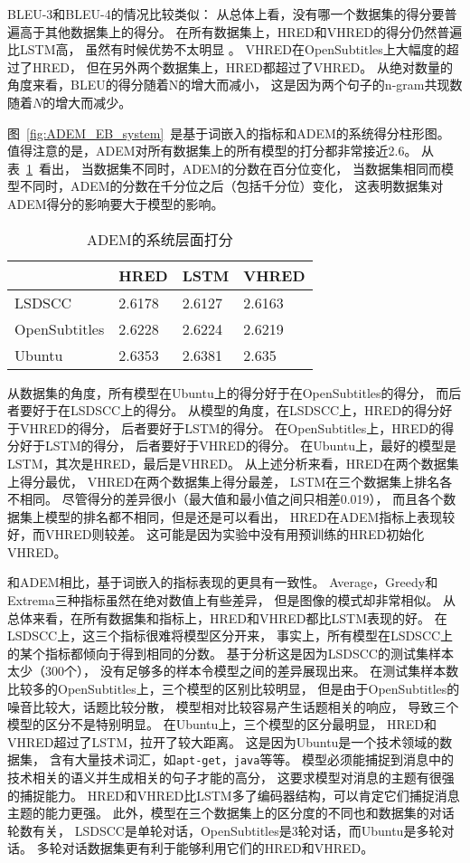 BLEU-3和BLEU-4的情况比较类似：
从总体上看，没有哪一个数据集的得分要普遍高于其他数据集上的得分。
在所有数据集上，HRED和VHRED的得分仍然普遍比LSTM高，
虽然有时候优势不太明显 。
VHRED在OpenSubtitles上大幅度的超过了HRED，
但在另外两个数据集上，HRED都超过了VHRED。
从绝对数量的角度来看，BLEU的得分随着N的增大而减小，
这是因为两个句子的n-gram共现数随着$N$的增大而减少。


图~\ref{fig:ADEM_EB_system}~是基于词嵌入的指标和ADEM的系统得分柱形图。
值得注意的是，ADEM对所有数据集上的所有模型的打分都非常接近2.6。
从表~\ref{tab:ADEM_system}~看出，
当数据集不同时，ADEM的分数在百分位变化，
当数据集相同而模型不同时，ADEM的分数在千分位之后（包括千分位）变化，
这表明数据集对ADEM得分的影响要大于模型的影响。
\begin{table}
    \centering
    \caption{ADEM的系统层面打分}
    \label{tab:ADEM_system}
    \begin{tabular}{llll}
        \toprule
        & HRED & LSTM & VHRED \\
        \midrule
        LSDSCC & 2.6178 & 2.6127 & 2.6163  \\
        OpenSubtitles & 2.6228 & 2.6224 & 2.6219 \\
        Ubuntu & 2.6353 & 2.6381 & 2.635 \\
        \bottomrule
    \end{tabular}
\end{table}
从数据集的角度，所有模型在Ubuntu上的得分好于在OpenSubtitles的得分，
而后者要好于在LSDSCC上的得分。
从模型的角度，在LSDSCC上，HRED的得分好于VHRED的得分，
后者要好于LSTM的得分。
在OpenSubtitles上，HRED的得分好于LSTM的得分，
后者要好于VHRED的得分。
在Ubuntu上，最好的模型是LSTM，其次是HRED，最后是VHRED。
从上述分析来看，HRED在两个数据集上得分最优，
VHRED在两个数据集上得分最差，
LSTM在三个数据集上排名各不相同。
尽管得分的差异很小（最大值和最小值之间只相差0.019），
而且各个数据集上模型的排名都不相同，但是还是可以看出，
HRED在ADEM指标上表现较好，而VHRED则较差。
这可能是因为实验中没有用预训练的HRED初始化VHRED。


和ADEM相比，基于词嵌入的指标表现的更具有一致性。
Average，Greedy和Extrema三种指标虽然在绝对数值上有些差异，
但是图像的模式却非常相似。
从总体来看，在所有数据集和指标上，HRED和VHRED都比LSTM表现的好。
在LSDSCC上，这三个指标很难将模型区分开来，
事实上，所有模型在LSDSCC上的某个指标都倾向于得到相同的分数。
基于分析这是因为LSDSCC的测试集样本太少（300个），
没有足够多的样本令模型之间的差异展现出来。
在测试集样本数比较多的OpenSubtitles上，三个模型的区别比较明显，
但是由于OpenSubtitles的噪音比较大，话题比较分散，
模型相对比较容易产生话题相关的响应，
导致三个模型的区分不是特别明显。
在Ubuntu上，三个模型的区分最明显，
HRED和VHRED超过了LSTM，拉开了较大距离。
这是因为Ubuntu是一个技术领域的数据集，
含有大量技术词汇，如\texttt{apt-get}，\texttt{java}等等。
模型必须能捕捉到消息中的技术相关的语义并生成相关的句子才能的高分，
这要求模型对消息的主题有很强的捕捉能力。
HRED和VHRED比LSTM多了编码器结构，可以肯定它们捕捉消息主题的能力更强。
此外，模型在三个数据集上的区分度的不同也和数据集的对话轮数有关，
LSDSCC是单轮对话，OpenSubtitles是3轮对话，而Ubuntu是多轮对话。
多轮对话数据集更有利于能够利用它们的HRED和VHRED。


